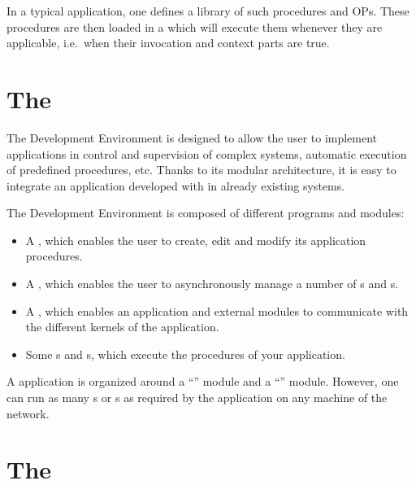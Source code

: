 In a typical \COPRS{} application, one defines a library of such procedures and
OPs. These procedures are then loaded in a \CPK{} which will execute them
whenever they are applicable, i.e.\  when their invocation and context parts are
true.

\section{The \COPRSDE{}}

The \COPRS{} Development Environment is designed to allow the user to implement
applications in control and supervision of complex systems, automatic execution
of predefined procedures, etc. Thanks to its modular architecture, it is easy
to integrate an application developed with \COPRS{} in already existing systems.


The \COPRS{} Development Environment is composed of different programs and
modules:

\begin{itemize}

\item A \OPE{}, which enables the user to create, edit and modify its
application procedures.

\item A \OPRSS{}, which enables the user to asynchronously manage a
number of \CPK{}s and \XPK{}s.

\item A \MPA{}, which enables an application and external
modules to communicate with the different kernels of the \COPRS{} application.

\item Some \CPK{}s and \XPK{}s, which execute the procedures of your
application.

\end{itemize}

A \COPRS{} application is organized around a ``\MPA{}'' module and a
``\OPRSS{}'' module.
However, one can run as many \CPK{}s or \XPK{}s as required by the application on any 
machine of the network.

\section{The \COPRSAE{}}

